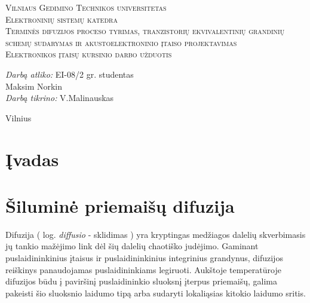 \documentclass[11pt,a4paper]{article}
\begin{document}
\begin{titlepage}
  
  \begin{center}
    \textsc{\LARGE Vilniaus Gedimino Technikos universitetas}\\[2mm]
    \textsc{\Large Elektroninių sistemų katedra}\\[70mm]
    \textsc{\Large Terminės difuzijos proceso tyrimas, tranzistorių ekvivalentinių grandinių schemų sudarymas ir akustoelektroninio įtaiso projektavimas}\\[10mm]
    \textsc{\normalsize Elektronikos įtaisų kursinio darbo užduotis}\\[40mm]
    \begin{minipage}{1\textwidth}
      \begin{flushright}
        \emph{Darbą atliko:} EI-08/2 gr. studentas\\ Maksim Norkin\\
        \emph{Darbą tikrino:} V.Malinauskas\\
      \end{flushright}
    \end{minipage}
    \vfill
    {\large Vilnius \\ \the\year}
  \end{center}
\end{titlepage}
\tableofcontents
\newpage
\section{Įvadas}
\section{Šiluminė priemaišų difuzija}
Difuzija ( log. \emph{diffusio} - sklidimas ) yra kryptingas medžiagos dalelių skverbimasis jų tankio mažėjimo 
link dėl šių dalelių chaotiško judėjimo. Gaminant puslaidininkinius įtaisus ir puslaidininkinius integrinius grandynus, 
difuzijos reiškinys panaudojamas puslaidininkiams legiruoti. Aukštoje temperatūroje difuzijos būdu į 
paviršinį puslaidininkio sluoksnį įterpus priemaišų, galima pakeisti šio sluoksnio laidumo tipą arba sudaryti lokaliąsias kitokio laidumo sritis.
\end{document}
